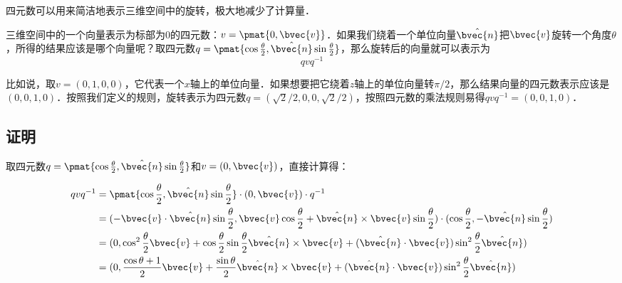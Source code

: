 
\begin{issues}
\issueAbstract
\issueTODO
\end{issues}


四元数可以用来简洁地表示三维空间中的旋转，极大地减少了计算量．

三维空间中的一个向量表示为标部为$0$的四元数：$v=\pmat{0, \bvec{v}}$．如果我们绕着一个单位向量$\hat{\bvec{n}}$把$\bvec{v}$旋转一个角度$\theta$，所得的结果应该是哪个向量呢？取四元数$q=\pmat{\cos{\frac{\theta}{2}}, \hat{\bvec{n}}\sin{\frac{\theta}{2}}}$，那么旋转后的向量就可以表示为
\begin{equation}
qvq^{-1}
\end{equation}

比如说，取$v=(0, 1, 0, 0)$，它代表一个$x$轴上的单位向量．如果想要把它绕着$z$轴上的单位向量转$\pi/2$，那么结果向量的四元数表示应该是$(0, 0, 1, 0)$．按照我们定义的规则，旋转表示为四元数$q=(\sqrt{2}/2, 0, 0, \sqrt{2}/2)$，按照四元数的乘法规则易得$qvq^{-1}=(0,0,1,0)$．

\subsection{证明}

取四元数$q=\pmat{\cos{\frac{\theta}{2}}, \hat{\bvec{n}}\sin{\frac{\theta}{2}}}$和$v=(0, \bvec{v})$，直接计算得：

\begin{equation}
\begin{aligned}
qvq^{-1}&=\pmat{\cos{\frac{\theta}{2}}, \hat{\bvec{n}}\sin{\frac{\theta}{2}}}\cdot (0, \bvec{v})\cdot q^{-1}\\&
=(-\bvec{v}\cdot\hat{\bvec{n}}\sin{\frac{\theta}{2}}, \bvec{v}\cos{\frac{\theta}{2}}+\hat{\bvec{n}}\times\bvec{v}\sin{\frac{\theta}{2}})\cdot (\cos{\frac{\theta}{2}}, -\hat{\bvec{n}}\sin{\frac{\theta}{2}})\\&
=(0, \cos^2\frac{\theta}{2}\bvec{v}+\cos\frac{\theta}{2}\sin\frac{\theta}{2}\hat{\bvec{n}}\times\bvec{v}+(\hat{\bvec{n}}\cdot\bvec{v})\sin^2\frac{\theta}{2}\hat{\bvec{n}})\\&
=(0, \frac{\cos\theta+1}{2}\bvec{v}+\frac{\sin\theta}{2}\hat{\bvec{n}}\times\bvec{v}+(\hat{\bvec{n}}\cdot\bvec{v})\sin^2\frac{\theta}{2}\hat{\bvec{n}})
\end{aligned}
\end{equation}

